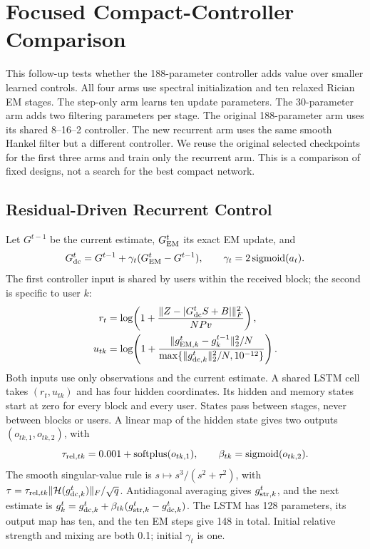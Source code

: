 \section{Focused Compact-Controller Comparison}
\label{sec:suppcompact}
This follow-up tests whether the 188-parameter controller adds value over
smaller learned controls. All four arms use spectral initialization and ten
relaxed Rician EM stages. The step-only arm learns ten update parameters.
The 30-parameter arm adds two filtering parameters per stage. The original
188-parameter arm uses its shared 8--16--2 controller. The new recurrent
arm uses the same smooth Hankel filter but a different controller. We
reuse the original selected checkpoints for the first three arms and
train only the recurrent arm. This is a comparison of fixed designs, not
a search for the best compact network.

\subsection{Residual-Driven Recurrent Control}
Let $G^{t-1}$ be the current estimate, $G_{\rm EM}^t$ its exact EM update,
and
\begin{equation}
 G_{\rm dc}^t=G^{t-1}+\gamma_t(G_{\rm EM}^t-G^{t-1}),\qquad
 \gamma_t=2\operatorname{sigmoid}(a_t).
\end{equation}
The first controller input is shared by users within the received block;
the second is specific to user $k$:
\begin{align}
 r_t&=\log\!\left(1+
 \frac{\|Z-|G_{\rm dc}^tS+B|\|_F^2}{NPv}\right),\\
 u_{tk}&=\log\!\left(1+
 \frac{\|g_{{\rm EM},k}^t-g_k^{t-1}\|_2^2/N}
 {\max\{\|g_{{\rm dc},k}^t\|_2^2/N,10^{-12}\}}\right).
\end{align}
Both inputs use only observations and the current estimate. A shared LSTM
cell takes $(r_t,u_{tk})$ and has four hidden coordinates. Its hidden and
memory states start at zero for every block and every user. States pass
between stages, never between blocks or users. A linear map of the hidden
state gives two outputs $(o_{tk,1},o_{tk,2})$, with
\begin{equation}
 \tau_{{\rm rel},tk}=0.001+\operatorname{softplus}(o_{tk,1}),\qquad
 \beta_{tk}=\operatorname{sigmoid}(o_{tk,2}).
\end{equation}
The smooth singular-value rule is $s\mapsto s^3/(s^2+\tau^2)$, with
$\tau=\tau_{{\rm rel},tk}\|\mathcal H(g_{{\rm dc},k}^t)\|_F/\sqrt q$.
Antidiagonal averaging gives $g_{{\rm str},k}^t$, and the next estimate is
$g_k^t=g_{{\rm dc},k}^t+\beta_{tk}(g_{{\rm str},k}^t-g_{{\rm dc},k}^t)$.
The LSTM has 128 parameters, its output map has ten, and the ten EM steps
give 148 in total. Initial relative strength and mixing are both 0.1;
initial $\gamma_t$ is one.

